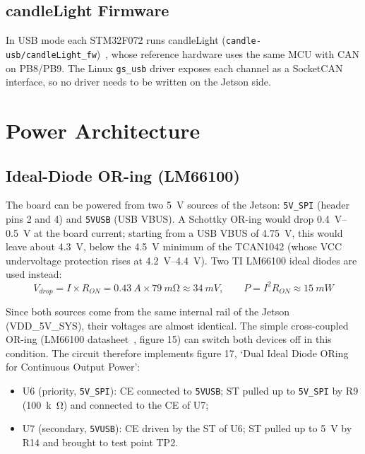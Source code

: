 \documentclass[11pt,a4paper]{article}
\newcommand{\net}[1]{\texttt{#1}}
\begin{document}
\subsection{candleLight Firmware}

In USB mode each STM32F072 runs candleLight (\texttt{candle-usb/candleLight\_fw})~\cite{candlelight}, whose
reference hardware uses the same MCU with CAN on PB8/PB9. The Linux \texttt{gs\_usb} driver
exposes each channel as a SocketCAN interface, so no driver needs to be written on the Jetson
side.

\section{Power Architecture}

\subsection{Ideal-Diode OR-ing (LM66100)}

The board can be powered from two \qty{5}{V} sources of the Jetson: \net{5V\_SPI} (header pins 2 and 4)
and \net{5VUSB} (USB VBUS). A Schottky OR-ing would drop \qtyrange{0.4}{0.5}{V} at the board current;
starting from a USB VBUS of \qty{4.75}{V}, this would leave about \qty{4.3}{V}, below the \qty{4.5}{V} minimum of
the TCAN1042 (whose VCC undervoltage protection rises at \qtyrange{4.2}{4.4}{V}). Two TI LM66100
ideal diodes are used instead:
\begin{equation}
V_{drop} = I \times R_{ON} = \qty{0.43}{A} \times \qty{79}{m\ohm} \approx \qty{34}{mV}, \qquad
P = I^2 R_{ON} \approx \qty{15}{mW}
\end{equation}

Since both sources come from the same internal rail of the Jetson (VDD\_5V\_SYS), their
voltages are almost identical. The simple cross-coupled OR-ing (LM66100 datasheet~\cite{lm66100}, figure
15) can switch both devices off in this condition. The circuit therefore implements figure 17,
`Dual Ideal Diode ORing for Continuous Output Power':
\begin{itemize}
    \item U6 (priority, \net{5V\_SPI}): CE connected to \net{5VUSB}; ST pulled up to \net{5V\_SPI} by R9 (\qty{100}{k\ohm}) and
    connected to the CE of U7;
    \item U7 (secondary, \net{5VUSB}): CE driven by the ST of U6; ST pulled up to \qty{5}{V} by R14 and
    brought to test point TP2.
\end{itemize}
\end{document}
